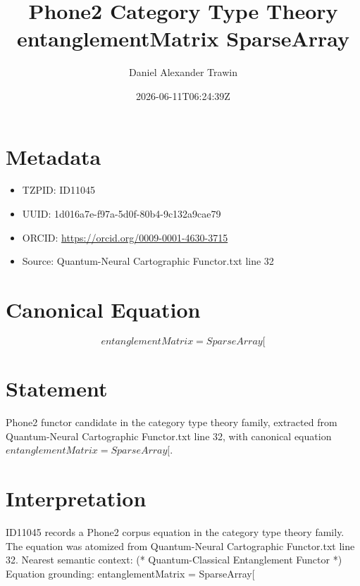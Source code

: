 \documentclass[11pt]{article}
\title{Phone2 Category Type Theory entanglementMatrix SparseArray}
\author{Daniel Alexander Trawin}
\date{2026-06-11T06:24:39Z}
\begin{document}
\maketitle
\section*{Metadata}
\begin{itemize}
\item TZPID: ID11045
\item UUID: 1d016a7e-f97a-5d0f-80b4-9c132a9cae79
\item ORCID: \url{https://orcid.org/0009-0001-4630-3715}
\item Source: Quantum-Neural Cartographic Functor.txt line 32
\end{itemize}
\section*{Canonical Equation}
\[
entanglementMatrix = SparseArray[
\]
\section*{Statement}
Phone2 functor candidate in the category type theory family, extracted from Quantum-Neural Cartographic Functor.txt line 32, with canonical equation $entanglementMatrix = SparseArray[$.
\section*{Interpretation}
ID11045 records a Phone2 corpus equation in the category type theory family. The equation was atomized from Quantum-Neural Cartographic Functor.txt line 32. Nearest semantic context: (* Quantum-Classical Entanglement Functor *) Equation grounding: entanglementMatrix = SparseArray[
\end{document}
